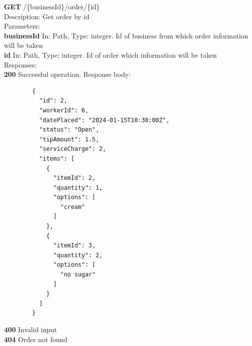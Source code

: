 \documentclass[11pt,a4paper,pdftex]{article}
\begin{document}
\hspace*{1em}\textbf{GET} /\{businessId\}/order/\{id\}\\
\hspace*{2em}Description: Get order by id\\
\hspace*{2em}Parameters:\\
\hspace*{3em}\textbf{businessId} In: Path, Type: integer. Id of business from which order information will be taken\\
\hspace*{3em}\textbf{id} In: Path, Type: integer. Id of order which information will be taken\\
\hspace*{2em}Responses:\\
\hspace*{3em}\textbf{200} Successful operation. Response body:
\begin{verbatim}
        {
          "id": 2,
          "workerId": 6,
          "datePlaced": "2024-01-15T10:30:00Z",
          "status": "Open",
          "tipAmount": 1.5,
          "serviceCharge": 2,
          "items": [
            {
              "itemId": 2,
              "quantity": 1,
              "options": [
                "cream"
              ]
            },
            {
              "itemId": 3,
              "quantity": 2,
              "options": [
                "no sugar"
              ]
            }
          ]
        }
\end{verbatim}
\hspace*{3em}\textbf{400} Invalid input\\
\hspace*{3em}\textbf{404} Order not found
\end{document}
